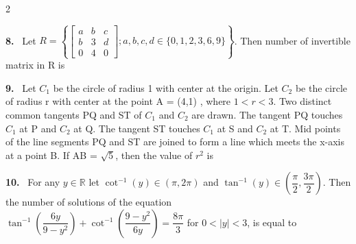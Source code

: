 \documentclass[10pt]{extarticle}
\newcommand{\qn}[1]{\par\smallskip\noindent\textbf{#1.}~}
\begin{document}
\begin{multicols}{2}
\qn{8} Let $R=\left\{\begin{bmatrix}a&b&c\\b&3&d\\0&4&0\end{bmatrix};a,b,c,d\in\{0,1,2,3,6,9\}\right\}$. Then number of invertible matrix in R is

\qn{9} Let $C_1$ be the circle of radius 1 with center at the origin. Let $C_2$ be the circle of radius r with center at the point A = (4,1) , where $1<r<3$. Two distinct common tangents PQ and ST of $C_1$ and $C_2$ are drawn. The tangent PQ touches $C_1$ at P and $C_2$ at Q. The tangent ST touches $C_1$ at S and $C_2$ at T. Mid points of the line segments PQ and ST are joined to form a line which meets the x-axis at a point B. If AB = $\sqrt5$, then the value of $r^2$ is

\qn{10} For any $y\in\mathbb R$ let $\cot^{-1}(y)\in(\pi,2\pi)$ and $\tan^{-1}(y)\in\left(\dfrac\pi2,\dfrac{3\pi}2\right)$. Then the number of solutions of the equation $\tan^{-1}\left(\dfrac{6y}{9-y^2}\right)+\cot^{-1}\left(\dfrac{9-y^2}{6y}\right)=\dfrac{8\pi}3$ for $0<|y|<3$, is equal to

\end{multicols}
\end{document}
